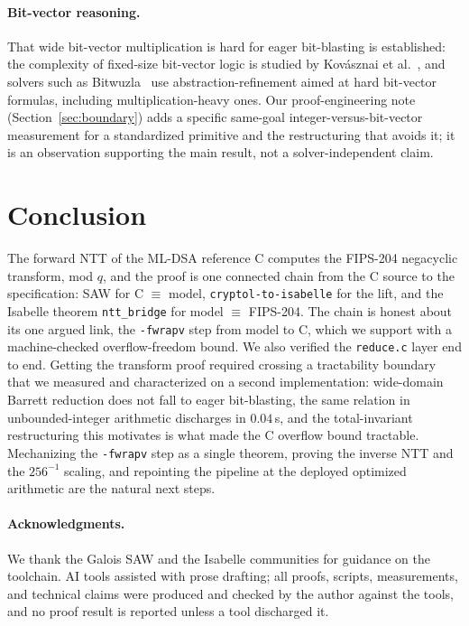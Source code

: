 \documentclass[journal=tches,submission,review]{iacrtrans}
\newcommand{\code}[1]{\texttt{#1}}
\begin{document}
\paragraph{Bit-vector reasoning.} That wide bit-vector multiplication is hard for eager bit-blasting is
established: the complexity of fixed-size bit-vector logic is studied by Kov\'asznai et
al.~\cite{bvcomplexity}, and solvers such as Bitwuzla~\cite{bitwuzla} use abstraction-refinement aimed at
hard bit-vector formulas, including multiplication-heavy ones. Our proof-engineering note (Section~\ref{sec:boundary}) adds a specific same-goal
integer-versus-bit-vector measurement for a standardized primitive and the restructuring that avoids it;
it is an observation supporting the main result, not a solver-independent claim.

\section{Conclusion}\label{sec:conclusion}

The forward NTT of the ML-DSA reference C computes the FIPS-204 negacyclic transform, mod $q$, and the
proof is one connected chain from the C source to the specification: SAW for C $\equiv$ model,
\code{cryptol-to-isabelle} for the lift, and the Isabelle theorem \code{ntt\_bridge} for model $\equiv$
FIPS-204. The chain is honest about its one argued link, the \code{-fwrapv} step from model to C, which
we support with a machine-checked overflow-freedom bound. We also verified the \code{reduce.c} layer end
to end. Getting the transform proof required crossing a tractability boundary that we measured and
characterized on a second implementation: wide-domain Barrett reduction does not fall to eager
bit-blasting, the same relation in unbounded-integer arithmetic discharges in $0.04$\,s, and the
total-invariant restructuring this motivates is what made the C overflow bound tractable. Mechanizing the
\code{-fwrapv} step as a single theorem, proving the inverse NTT and the $256^{-1}$ scaling, and
repointing the pipeline at the deployed optimized arithmetic are the natural next steps.

\paragraph{Acknowledgments.} We thank the Galois SAW and the Isabelle communities for guidance on the
toolchain. AI tools assisted with prose drafting; all proofs, scripts, measurements, and technical claims
were produced and checked by the author against the tools, and no proof result is reported unless a tool
discharged it.
\end{document}
